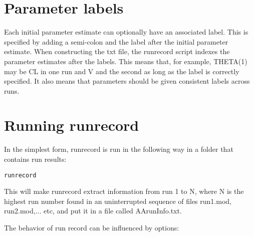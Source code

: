 \section{Parameter labels}
Each initial parameter estimate can optionally have an associated label. This is specified by adding a semi-colon and the label after the initial parameter estimate. When constructing  the txt file, the runrecord script indexes the parameter estimates after the labels. This means that, for example, THETA(1) may be CL in one run and V and the second as long as the label is correctly specified. It also means that parameters should be given consistent labels across runs.

\section{Running runrecord}

In the simplest form, runrecord is run in the following way in a folder that contains run results:
\begin{verbatim}
runrecord
\end{verbatim}
This will make runrecord extract information from run 1 to N, where N is the highest run number found in an uninterrupted sequence
of files run1.mod, run2.mod,... etc,
and put it in a file called AArunInfo.txt. 

The behavior of run record can be influenced by options:

